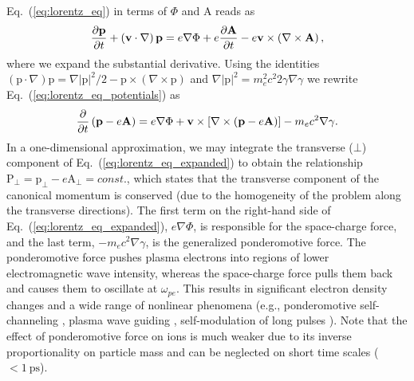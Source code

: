 \documentclass[10pt, a4paper, twoside, openright]{report}
\newcommand{\norm}[1]{|#1|}
\renewcommand{\vec}[1]{\boldsymbol{\mathrm{#1}}}
\newcommand{\rot}[1]{\nabla \times #1}
\newcommand{\grad}[1]{\nabla #1}
\begin{document}
Eq.~(\ref{eq:lorentz_eq}) in terms of $ \Phi $ and $ \vec{A} $ reads as
\begin{equation}\label{eq:lorentz_eq_potentials}
	\diffp{\vec{p}}{t} + \left(\vec{v} \cdot \grad \right) \vec{p} = e \grad{\Phi} + e \diffp{\vec{A}}{t} - e \vec{v} \times \left( \rot{\vec{A}} \right),
\end{equation}
where we expand the substantial derivative. Using the identities $ \left(\vec{p} \cdot \grad{} \right) \vec{p} = \grad{\norm{\vec{p}}^2} / 2 - \vec{p} \times \left( \rot{\vec{p}} \right) $ and $ \grad{\norm{\vec{p}}^2} = m_e^2 c^2 2 \gamma \grad{\gamma} $ we rewrite Eq.~(\ref{eq:lorentz_eq_potentials}) as
\begin{equation}\label{eq:lorentz_eq_expanded}
	\diffp{}{t} \left( \vec{p} - e \vec{A} \right) = e \grad{\Phi} + \vec{v} \times \left[ \rot{\left(\vec{p} - e \vec{A} \right)} \right] - m_e c^2 \grad{\gamma}.
\end{equation}
In a one-dimensional approximation, we may integrate the transverse ($ \bot $) component of Eq.~(\ref{eq:lorentz_eq_expanded}) to obtain the relationship $ \vec{P}_{\bot} = \vec{p}_{\bot} - e \vec{A}_{\bot} = const. $, which states that the transverse component of the canonical momentum is conserved (due to the homogeneity of the problem along the transverse directions). The first term on the right-hand side of Eq.~(\ref{eq:lorentz_eq_expanded}), $ e \grad{\Phi} $, is responsible for the space-charge force, and the last term, $ - m_e c^2 \grad{\gamma} $, is the generalized ponderomotive force. The ponderomotive force pushes plasma electrons into regions of lower electromagnetic wave intensity, whereas the space-charge force pulls them back and causes them to oscillate at $ \omega_{pe} $. This results in significant electron density changes and a wide range of nonlinear phenomena (e.g., ponderomotive self-channeling \cite{Sun1987, Kurki-Suonio1989, Borisov1992}, plasma wave guiding \cite{Sprangle1990, Sprangle1992, Chen1993}, self-modulation of long pulses \cite{Andreev1992, Antonsen1992, Krall1993}). Note that the effect of ponderomotive force on ions is much weaker due to its inverse proportionality on particle mass and can be neglected on short time scales ($ < 1 \ \mathrm{ps} $).
\end{document}
